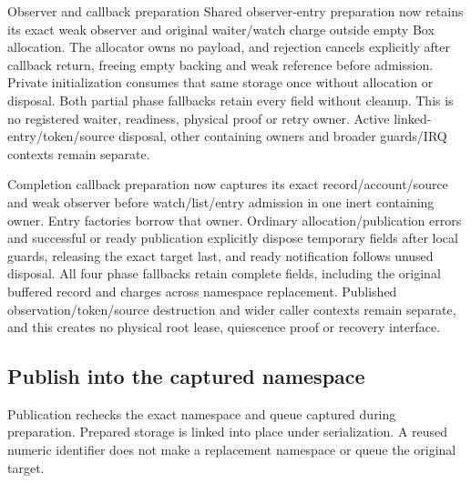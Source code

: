 \begin{implementationdetail}{Observer and callback preparation}
Shared observer-entry preparation now retains its exact weak observer and
original waiter/watch charge outside empty Box allocation. The allocator owns
no payload, and rejection cancels explicitly after callback return, freeing empty
backing and weak reference before admission. Private initialization consumes
that same storage once without allocation or disposal. Both partial phase
fallbacks retain every field without cleanup. This is no registered waiter,
readiness, physical proof or retry owner. Active linked-entry/token/source disposal,
other containing owners and broader guards/IRQ contexts remain separate.

Completion callback preparation now captures its exact record/account/source
and weak observer before watch/list/entry admission in one inert containing
owner. Entry factories borrow that owner. Ordinary allocation/publication errors
and successful or ready publication explicitly dispose temporary fields after
local guards, releasing the exact target last, and ready notification follows
unused disposal. All four phase fallbacks retain complete fields, including the
original buffered record and charges across namespace replacement. Published
observation/token/source destruction and wider caller contexts remain separate, and
this creates no physical root lease, quiescence proof or recovery interface.
\end{implementationdetail}

\subsection{Publish into the captured namespace}

Publication rechecks the exact namespace and queue captured during preparation.
Prepared storage is linked into place under serialization. A reused numeric
identifier does not make a replacement namespace or queue the original target.

